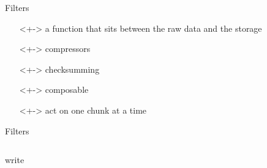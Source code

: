 \documentclass{beamer}
\begin{document}
\begin{frame}{Filters}
  \begin{definition}[Filter]
    \begin{itemize}
    \item[]<+-> a function that sits between the raw data and the storage
    \item[]<+-> compressors
    \item[]<+-> checksumming
    \item[]<+-> composable
    \item[]<+-> act on one chunk at a time
    \end{itemize}
  \end{definition}
\end{frame}
      
\begin{frame}{Filters}
  \begin{columns}
    \begin{block}{write}
      \begin{center}

\end{center}
\end{block}
\end{columns}
\end{frame}
\end{document}
